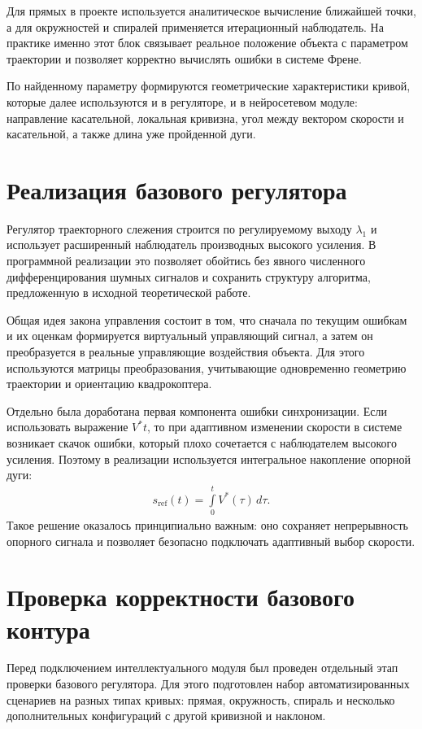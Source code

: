 Для прямых в проекте используется аналитическое вычисление ближайшей точки, а для окружностей и спиралей применяется итерационный наблюдатель. На практике именно этот блок связывает реальное положение объекта с параметром траектории и позволяет корректно вычислять ошибки в системе Френе.

По найденному параметру формируются геометрические характеристики кривой, которые далее используются и в регуляторе, и в нейросетевом модуле: направление касательной, локальная кривизна, угол между вектором скорости и касательной, а также длина уже пройденной дуги.

\section{Реализация базового регулятора}

Регулятор траекторного слежения строится по регулируемому выходу $\lambda_1$ и использует расширенный наблюдатель производных высокого усиления. В программной реализации это позволяет обойтись без явного численного дифференцирования шумных сигналов и сохранить структуру алгоритма, предложенную в исходной теоретической работе.

Общая идея закона управления состоит в том, что сначала по текущим ошибкам и их оценкам формируется виртуальный управляющий сигнал, а затем он преобразуется в реальные управляющие воздействия объекта. Для этого используются матрицы преобразования, учитывающие одновременно геометрию траектории и ориентацию квадрокоптера.

Отдельно была доработана первая компонента ошибки синхронизации. Если использовать выражение $V^{\ast} t$, то при адаптивном изменении скорости в системе возникает скачок ошибки, который плохо сочетается с наблюдателем высокого усиления. Поэтому в реализации используется интегральное накопление опорной дуги:
\begin{gather}
    s_{\mathrm{ref}}(t) = \int\limits_0^t V^{\ast}(\tau)\, d\tau.
\end{gather}
Такое решение оказалось принципиально важным: оно сохраняет непрерывность опорного сигнала и позволяет безопасно подключать адаптивный выбор скорости.

\section{Проверка корректности базового контура}

Перед подключением интеллектуального модуля был проведен отдельный этап проверки базового регулятора. Для этого подготовлен набор автоматизированных сценариев на разных типах кривых: прямая, окружность, спираль и несколько дополнительных конфигураций с другой кривизной и наклоном.

